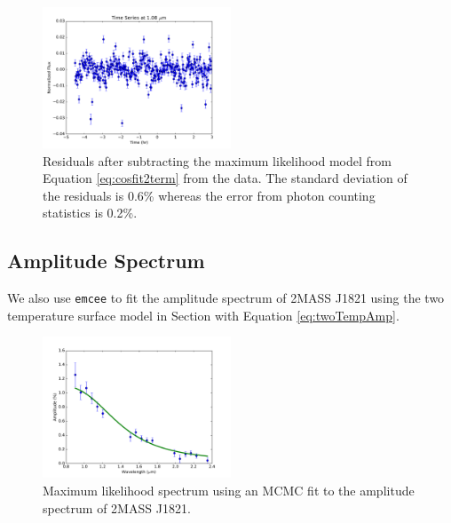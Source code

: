 \documentclass[twocolumn]{aastex6}
\begin{document}
\begin{figure}
\begin{centering}
\includegraphics[width=0.5\textwidth]{residual_ML.pdf}
\caption{Residuals after subtracting the maximum likelihood model from Equation \ref{eq:cosfit2term} from the data. The standard deviation of the residuals is 0.6\% whereas the error from photon counting statistics is 0.2\%.}\label{fig:resid2Cosfit}
\end{centering}
\end{figure}

\clearpage
\pagebreak
\subsection{Amplitude Spectrum}

We also use \texttt{emcee} to fit the amplitude spectrum of 2MASS J1821 using the two temperature surface model in Section \label{sec:spotModel} with Equation \ref{eq:twoTempAmp}.

\begin{figure}
\begin{centering}
\includegraphics[width=0.5\textwidth]{best_fit_spec_2temp.pdf}
\caption{Maximum likelihood spectrum using an MCMC fit to the amplitude spectrum of 2MASS J1821.}\label{fig:ML2Tempfit}
\end{centering}
\end{figure}
\end{document}
